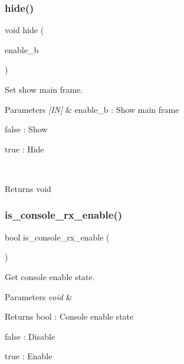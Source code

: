 \subsubsection{hide()}
{\footnotesize\ttfamily void hide (\begin{DoxyParamCaption}\item[{bool}]{enable\+\_\+b }\end{DoxyParamCaption})}



Set show main frame. 


\begin{DoxyCode}{0}
\end{DoxyCode}



\begin{DoxyParams}{Parameters}
{\em \mbox{[}\+I\+N\mbox{]}} & enable\+\_\+b \+: Show main frame \begin{DoxyItemize}
\item false \+: Show \item true \+: Hide \end{DoxyItemize}
\\
\hline
\end{DoxyParams}
\begin{DoxyReturn}{Returns}
void 
\end{DoxyReturn}
\mbox{\label{classmain__frame_a7ba59ce4eb6c8eb6bdf549389b59ef43}} 
\subsubsection{is\_console\_rx\_enable()}
{\footnotesize\ttfamily bool is\+\_\+console\+\_\+rx\+\_\+enable (\begin{DoxyParamCaption}\item[{void}]{ }\end{DoxyParamCaption})}



Get console enable state. 


\begin{DoxyCode}{0}
\end{DoxyCode}



\begin{DoxyParams}{Parameters}
{\em void} & \\
\hline
\end{DoxyParams}
\begin{DoxyReturn}{Returns}
bool \+: Console enable state \begin{DoxyItemize}
\item false \+: Disable \item true \+: Enable \end{DoxyItemize}

\end{DoxyReturn}
\mbox{\label{classmain__frame_a2cab3b1832cb16b04d1df3a6e570825f}} 
